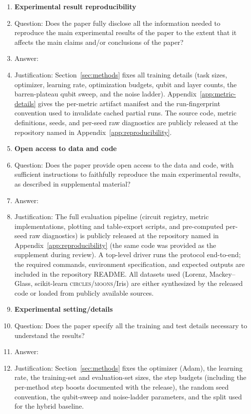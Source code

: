 \begin{enumerate}
\item {\bf Experimental result reproducibility}
    \item[] Question: Does the paper fully disclose all the information needed to reproduce the main experimental results of the paper to the extent that it affects the main claims and/or conclusions of the paper?
    \item[] Answer: \answerYes{}
    \item[] Justification: Section~\ref{sec:methods} fixes all training details (task sizes, optimizer, learning rate, optimization budgets, qubit and layer counts, the barren-plateau qubit sweep, and the noise ladder). Appendix~\ref{app:metric-details} gives the per-metric artifact manifest and the run-fingerprint convention used to invalidate cached partial runs. The source code, metric definitions, seeds, and per-seed raw diagnostics are publicly released at the repository named in Appendix~\ref{app:reproducibility}.

\item {\bf Open access to data and code}
    \item[] Question: Does the paper provide open access to the data and code, with sufficient instructions to faithfully reproduce the main experimental results, as described in supplemental material?
    \item[] Answer: \answerYes{}
    \item[] Justification: The full evaluation pipeline (circuit registry, metric implementations, plotting and table-export scripts, and pre-computed per-seed raw diagnostics) is publicly released at the repository named in Appendix~\ref{app:reproducibility} (the same code was provided as the supplement during review). A top-level driver runs the protocol end-to-end; the required commands, environment specification, and expected outputs are included in the repository README. All datasets used (Lorenz, Mackey--Glass, scikit-learn \textsc{circles}/\textsc{moons}/Iris) are either synthesized by the released code or loaded from publicly available sources.

\item {\bf Experimental setting/details}
    \item[] Question: Does the paper specify all the training and test details necessary to understand the results?
    \item[] Answer: \answerYes{}
    \item[] Justification: Section~\ref{sec:methods} fixes the optimizer (Adam), the learning rate, the training-set and evaluation-set sizes, the step budgets (including the per-method step boosts documented with the release), the random seed convention, the qubit-sweep and noise-ladder parameters, and the split used for the hybrid baseline.


\end{enumerate}
